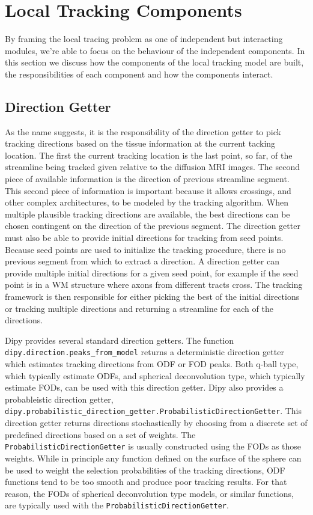 \section{Local Tracking Components}
    By framing the local tracing problem as one of independent but interacting modules, we're able to focus on the behaviour of the independent components. In this section we discuss how the components of the local tracking model are built, the responsibilities of each component and how the components interact.

\subsection{Direction Getter}
    As the name suggests, it is the responsibility of the direction getter to pick tracking directions based on the tissue information at the current tacking location. The first the current tracking location is the last point, so far, of the streamline being tracked given relative to the diffusion MRI images. The second piece of available information is the direction of previous streamline segment. This second piece of information is important because it allows crossings, and other complex architectures, to be modeled by the tracking algorithm. When multiple plausible tracking directions are available, the best directions can be chosen contingent on the direction of the previous segment. The direction getter must also be able to provide initial directions for tracking from seed points. Because seed points are used to initialize the tracking procedure, there is no previous segment from which to extract a direction. A direction getter can provide multiple initial directions for a given seed point, for example if the seed point is in a WM structure where axons from different tracts cross. The tracking framework is then responsible for either picking the best of the initial directions or tracking multiple directions and returning a streamline for each of the directions.
    
    Dipy provides several standard direction getters. The function \verb|dipy.direction.peaks_from_model| returns a deterministic direction getter which estimates tracking directions from ODF or FOD peaks. Both q-ball type, which typically estimate ODFs, and spherical deconvolution type, which typically estimate FODs, can be used with this direction getter. Dipy also provides a probableistic direction getter, \verb|dipy.probabilistic_direction_getter.ProbabilisticDirectionGetter|. This direction getter returns directions stochastically by choosing from a discrete set of predefined directions based on a set of weights. The \verb|ProbabilisticDirectionGetter| is usually constructed using the FODs as those weights. While in principle any function defined on the surface of the sphere can be used to weight the selection probabilities of the tracking directions, ODF functions tend to be too smooth and produce poor tracking results. For that reason, the FODs of spherical deconvolution type models, or similar functions, are typically used with the \verb|ProbabilisticDirectionGetter|.

